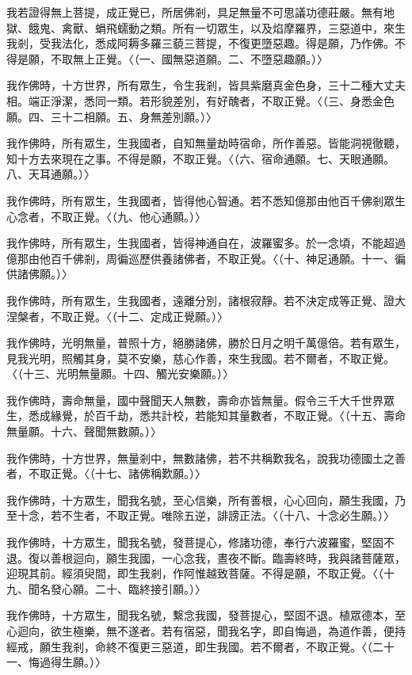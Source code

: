 \documentclass{zhvt-classic}
\begin{document}
我若證得無上菩提，成正覺已，所居佛剎，具足無量不可思議功德莊嚴。無有地獄、餓鬼、禽獸、蜎飛蠕動之類。所有一切眾生，以及焰摩羅界，三惡道中，來生我剎，受我法化，悉成阿耨多羅三藐三菩提，不復更墮惡趣。得是願，乃作佛。不得是願，不取無上正覺。〈（一、國無惡道願。二、不墮惡趣願。）〉

我作佛時，十方世界，所有眾生，令生我剎，皆具紫磨真金色身，三十二種大丈夫相。端正淨潔，悉同一類。若形貌差別，有好醜者，不取正覺。〈（三、身悉金色願。四、三十二相願。五、身無差別願。）〉

我作佛時，所有眾生，生我國者，自知無量劫時宿命，所作善惡。皆能洞視徹聽，知十方去來現在之事。不得是願，不取正覺。〈（六、宿命通願。七、天眼通願。八、天耳通願。）〉

我作佛時，所有眾生，生我國者，皆得他心智通。若不悉知億那由他百千佛剎眾生心念者，不取正覺。〈（九、他心通願。）〉

我作佛時，所有眾生，生我國者，皆得神通自在，波羅蜜多。於一念頃，不能超過億那由他百千佛剎，周徧巡歷供養諸佛者，不取正覺。〈（十、神足通願。十一、徧供諸佛願。）〉

我作佛時，所有眾生，生我國者，遠離分別，諸根寂靜。若不決定成等正覺、證大涅槃者，不取正覺。〈（十二、定成正覺願。）〉

我作佛時，光明無量，普照十方，絕勝諸佛，勝於日月之明千萬億倍。若有眾生，見我光明，照觸其身，莫不安樂，慈心作善，來生我國。若不爾者，不取正覺。〈（十三、光明無量願。十四、觸光安樂願。）〉

我作佛時，壽命無量，國中聲聞天人無數，壽命亦皆無量。假令三千大千世界眾生，悉成緣覺，於百千劫，悉共計校，若能知其量數者，不取正覺。〈（十五、壽命無量願。十六、聲聞無數願。）〉

我作佛時，十方世界，無量剎中，無數諸佛，若不共稱歎我名，說我功德國土之善者，不取正覺。〈（十七、諸佛稱歎願。）〉

我作佛時，十方眾生，聞我名號，至心信樂，所有善根，心心回向，願生我國，乃至十念，若不生者，不取正覺。唯除五逆，誹謗正法。〈（十八、十念必生願。）〉

我作佛時，十方眾生，聞我名號，發菩提心，修諸功德，奉行六波羅蜜，堅固不退。復以善根迴向，願生我國，一心念我，晝夜不斷。臨壽終時，我與諸菩薩眾，迎現其前。經須臾間，即生我剎，作阿惟越致菩薩。不得是願，不取正覺。〈（十九、聞名發心願。二十、臨終接引願。）〉

我作佛時，十方眾生，聞我名號，繫念我國，發菩提心，堅固不退。植眾德本，至心迴向，欲生極樂，無不遂者。若有宿惡，聞我名字，即自悔過，為道作善，便持經戒，願生我剎，命終不復更三惡道，即生我國。若不爾者，不取正覺。〈（二十一、悔過得生願。）〉
\end{document}
